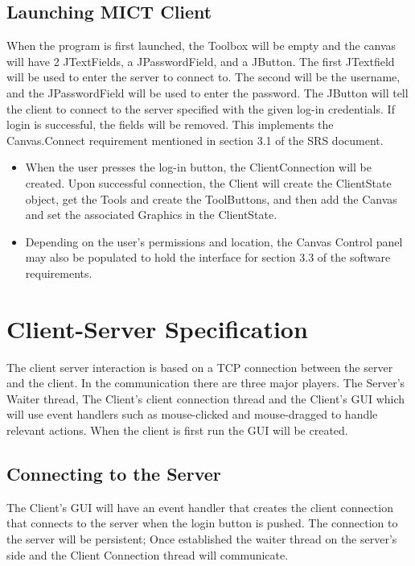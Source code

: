 \documentclass[12pt]{article}
\begin{document}
\subsection{Launching MICT Client}
When the program is first launched, the Toolbox will be empty and the
     canvas will have 2 JTextFields, a JPasswordField, and a JButton. The first
     JTextfield will be used to enter the server to connect to. The second will
     be the username, and the JPasswordField will be used to enter the
     password. The JButton will tell the client to connect to the server
     specified with the given log-in credentials. If login is successful, the
     fields will be removed. This implements the Canvas.Connect requirement
     mentioned in section 3.1 of the SRS document.
     \begin{itemize}
     \item
     When the user presses the log-in button, the ClientConnection will be
     created. Upon successful connection, the Client will create the
     ClientState object, get the Tools and create the ToolButtons, and then add
     the Canvas and set the associated Graphics in the ClientState.
     \item
     Depending on the user's permissions and location, the Canvas Control panel may also
     be populated to hold the interface for section 3.3 of the software
     requirements.
     \end{itemize}

\section{Client-Server Specification}
The client server interaction is based on a TCP connection between the server and the client.  
In the communication there are three major players.  
The Server's Waiter thread, The Client's client connection thread and the Client's GUI which will use event handlers such as mouse-clicked and mouse-dragged to handle relevant actions.  When the client is first run the GUI will be created.  


\subsection{Connecting to the Server}
The Client's GUI will have an event handler that creates the client connection that connects to the server when the login button is pushed. The connection to the server will be persistent;  Once established the waiter thread on the server's side and the Client Connection thread will communicate.  
\end{document}
